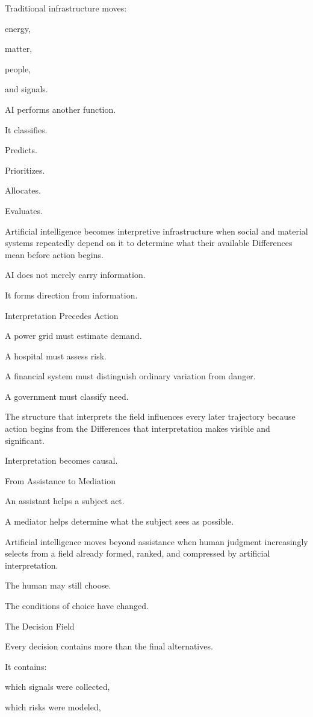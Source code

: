 Traditional infrastructure moves:

energy,

matter,

people,

and signals.

AI performs another function.

It classifies.

Predicts.

Prioritizes.

Allocates.

Evaluates.

Artificial intelligence becomes interpretive infrastructure when social and material systems repeatedly depend on it to determine what their available Differences mean before action begins.

AI does not merely carry information.

It forms direction from information.

Interpretation Precedes Action

A power grid must estimate demand.

A hospital must assess risk.

A financial system must distinguish ordinary variation from danger.

A government must classify need.

The structure that interprets the field influences every later trajectory because action begins from the Differences that interpretation makes visible and significant.

Interpretation becomes causal.

From Assistance to Mediation

An assistant helps a subject act.

A mediator helps determine what the subject sees as possible.

Artificial intelligence moves beyond assistance when human judgment increasingly selects from a field already formed, ranked, and compressed by artificial interpretation.

The human may still choose.

The conditions of choice have changed.

The Decision Field

Every decision contains more than the final alternatives.

It contains:

which signals were collected,

which risks were modeled,

